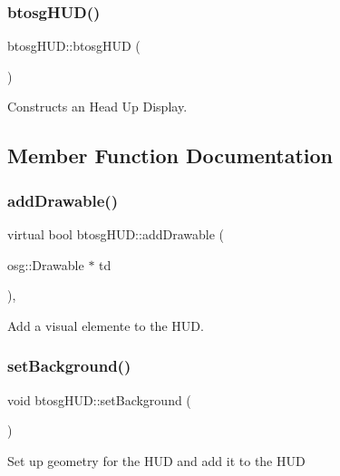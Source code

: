 \subsubsection{\texorpdfstring{btosg\+H\+U\+D()}{btosgHUD()}}
{\footnotesize\ttfamily btosg\+H\+U\+D\+::btosg\+H\+UD (\begin{DoxyParamCaption}{ }\end{DoxyParamCaption})\hspace{0.3cm}{\ttfamily [inline]}}

Constructs an Head Up Display. 

\subsection{Member Function Documentation}
\mbox{\label{classbtosgHUD_a182be3e4bdf00f9ff2b9c482833089a4}} 
\subsubsection{\texorpdfstring{add\+Drawable()}{addDrawable()}}
{\footnotesize\ttfamily virtual bool btosg\+H\+U\+D\+::add\+Drawable (\begin{DoxyParamCaption}\item[{osg\+::\+Drawable $\ast$}]{td }\end{DoxyParamCaption})\hspace{0.3cm}{\ttfamily [inline]}, {\ttfamily [virtual]}}

Add a visual elemente to the H\+UD. \mbox{\label{classbtosgHUD_a18c1eb80934574e6bdabbbee43e0bfeb}} 
\subsubsection{\texorpdfstring{set\+Background()}{setBackground()}}
{\footnotesize\ttfamily void btosg\+H\+U\+D\+::set\+Background (\begin{DoxyParamCaption}{ }\end{DoxyParamCaption})\hspace{0.3cm}{\ttfamily [inline]}}

Set up geometry for the H\+UD and add it to the H\+UD 

